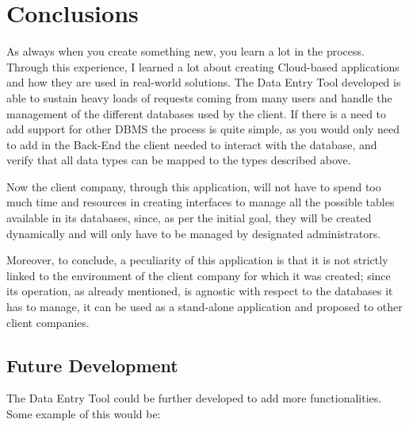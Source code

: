 \chapter{Conclusions}

As always when you create something new, you learn a lot in the process. Through this experience, I learned a lot about creating Cloud-based applications and how they are used in real-world solutions. The Data Entry Tool developed is able to sustain heavy loads of requests coming from many users and handle the management of the different databases used by the client. If there is a need to add support for other DBMS the process is quite simple, as you would only need to add in the Back-End the client needed to interact with the database, and verify that all data types can be mapped to the types described above. 

Now the client company, through this application, will not have to spend too much time and resources in creating interfaces to manage all the possible tables available in its databases, since, as per the initial goal, they will be created dynamically and will only have to be managed by designated administrators.

Moreover, to conclude, a peculiarity of this application is that it is not strictly linked to the environment of the client company for which it was created; since its operation, as already mentioned, is agnostic with respect to the databases it has to manage, it can be used as a stand-alone application and proposed to other client companies.


\section{Future Development}
The Data Entry Tool could be further developed to add more functionalities. Some example of this would be:

